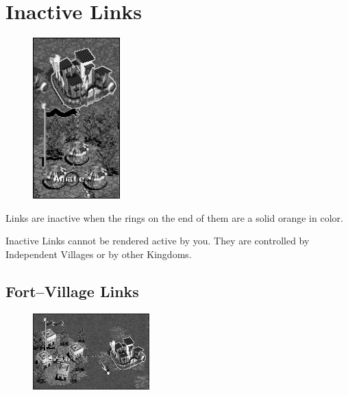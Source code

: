 \section{Inactive Links}

\begin{figure}
	\vspace{-20pt}
	\begin{center}
		\includegraphics[width=0.3\textwidth]{Iinactivelink}
	\end{center}
	\vspace{-20pt}
\end{figure}

Links are inactive when the rings on the end of them are a solid orange in color.

Inactive Links cannot be rendered active by you. They are controlled by Independent Villages or by other Kingdoms. 

\clearpage

\subsection{Fort–Village Links}

\begin{figure}
	\vspace{-20pt}
	\begin{center}
		\includegraphics[width=0.4\textwidth]{Iactivelink_fort}
	\end{center}
	\vspace{-20pt}
\end{figure}


